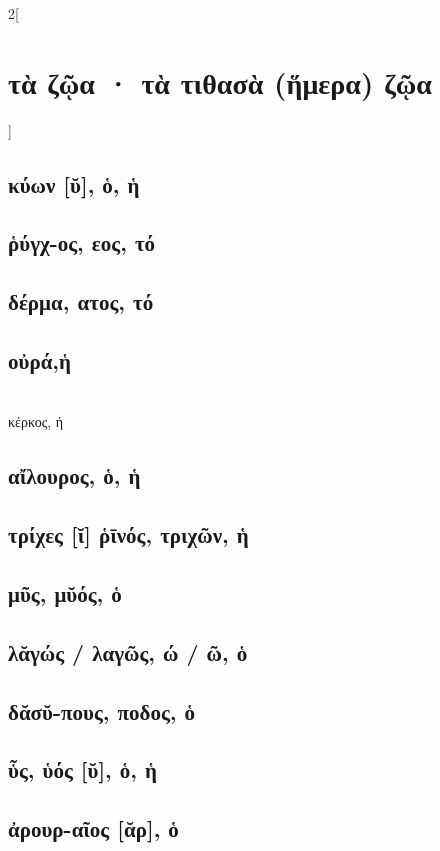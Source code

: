 \documentclass{book}
\begin{document}
\begin{multicols}{2}[\section{τὰ ζῷα · τὰ τιθασὰ (ἥμερα) ζῷα}]
\subsection{κύων [ῠ], ὁ, ἡ}
\subsection{ῥύγχ-ος, εος, τό}
\subsection{δέρμα, ατος, τό}
\subsection{οὐρά,ἡ}
 ~\\
κέρκος, ἡ
\subsection{αἴλουρος, ὁ, ἡ}
\subsection{τρίχες [ῐ] ῥῑνός, τριχῶν, ἡ}
\subsection{μῦς, μῠός, ὁ}
\subsection{λᾰγώς / λαγῶς, ώ / ῶ, ὁ}
\subsection{δᾰσῠ-πους, ποδος, ὁ}
\subsection{ὗς, ὑός [ῠ], ὁ, ἡ}
\subsection{ἀρουρ-αῖος [ᾰρ], ὁ}

\end{multicols}
\end{document}
